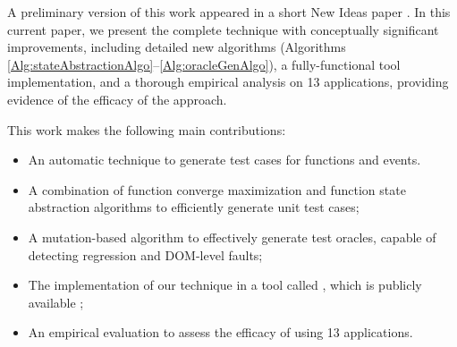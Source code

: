 %

A preliminary version of this work appeared in a short New Ideas paper \cite{shabnam:ase13}. In this current paper, we present the complete technique with conceptually significant improvements, including detailed new algorithms (Algorithms \ref{Alg:stateAbstractionAlgo}--\ref{Alg:oracleGenAlgo}), a fully-functional tool implementation, and a thorough empirical analysis on 13 \javascript applications, providing evidence of the efficacy of the approach.

This work makes the following main contributions:
\begin{itemize}

\item An automatic technique to generate test cases for \javascript functions and events.

\item A combination of function converge maximization and function state abstraction algorithms to efficiently generate unit test cases;
\item A mutation-based algorithm to effectively generate test oracles, capable of detecting regression \javascript and DOM-level faults;%
\item The implementation of our technique in a tool called \tool, which is publicly available \cite{jseft-dl};%
\item An empirical evaluation to assess the efficacy of \tool using 13 \javascript applications.
\end{itemize} 

